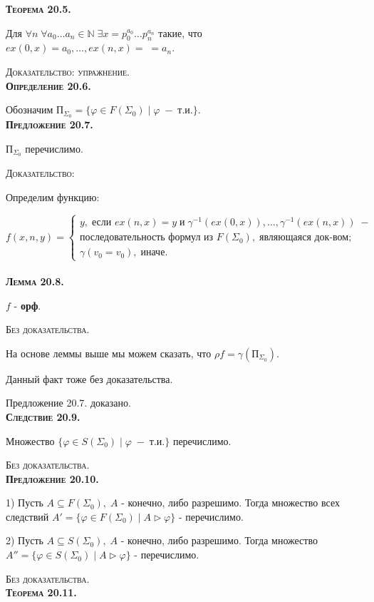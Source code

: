 \documentclass[18pt, a4paper]{extarticle}
\newcommand{\opred}[1]{\textbf{\textsc{Определение #1}}}
\newcommand{\predl}[1]{\textbf{\textsc{Предложение #1}}}
\newcommand{\sled}[1]{\textbf{\textsc{Следствие #1}}}
\newcommand{\teor}[1]{\textbf{\textsc{Теорема #1}}}
\newcommand{\lemma}[1]{\textbf{\textsc{Лемма #1}}}
\newcommand{\vp}{\varphi}
\newcommand{\dok}{\textsc{Доказательство:}}
\newcommand{\dokup}{\textsc{Доказательство: упражнение.}}
\newcommand{\bezdok}{\textsc{Без доказательства.}}
\begin{document}
\teor{20.5.} 

Для $\forall n\;\forall a_0\dots a_n\in\mathbb N\;\exists x=p_0^{a_0}\dots p_n^{a_n}$ такие, что $ex(0,x)=a_0,\dots,ex(n,x)=\;=a_n$.

\dokup\\

\opred{20.6.} 

Обозначим $\text{П}_{\Sigma_0}=\{\vp\in F(\Sigma_0)\;|\;\vp\;-\;\text{т.и.}\}$.\\

\predl{20.7.} 

$\text{П}_{\Sigma_0}$ перечислимо.

\dok

Определим функцию:

$f(x,n,y)=\begin{cases}
   y,\;\text{если }ex(n,x)=y\;\text{и}\;\gamma^{-1}(ex(0,x)),\dots,\gamma^{-1}(ex(n,x))\;-\\\text{последовательность формул из }F(\Sigma_0),\;\text{являющаяся док-вом;}\\
   \gamma(v_0=v_0),\;\text{иначе}.
\end{cases}$\\\\

\lemma{20.8.} 

$f$ - \textbf{орф}.

\bezdok

На основе леммы выше мы можем сказать, что $\rho f=\gamma(\text{П}_{\Sigma_0})$.

Данный факт тоже без доказательства.

Предложение 20.7. доказано.\\

\sled{20.9.} 

Множество $\{\vp\in S(\Sigma_0)\;|\;\vp\;-\;\text{т.и.}\}$ перечислимо.

\bezdok\\

\predl{20.10.} 

1) Пусть $A\subseteq F(\Sigma_0),\;A$ - конечно, либо разрешимо. Тогда множество всех следствий $A'=\{\vp\in F(\Sigma_0)\;|\;A\rhd\vp\}$ - перечислимо.

2) Пусть $A\subseteq S(\Sigma_0),\;A$ - конечно, либо разрешимо. Тогда множество $A''=\{\vp\in S(\Sigma_0)\;|\;A\rhd\vp\}$ - перечислимо.

\bezdok\\

\teor{20.11.} 
\end{document}

